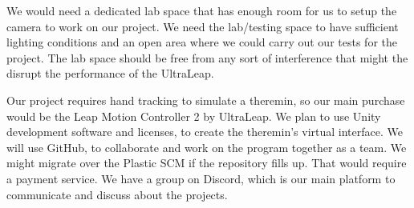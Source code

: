 We would need a dedicated lab space that has enough room for us to setup the camera to work on our project. We need the lab/testing space to have sufficient lighting conditions and an open area where we could carry out our tests for the project. The lab space should be free from any sort of interference that might the disrupt the performance of the UltraLeap. 

Our project requires hand tracking to simulate a theremin, so our main purchase would be the Leap Motion Controller 2 by UltraLeap. We plan to use Unity development software and licenses, to create the theremin's virtual interface. We will use GitHub, to collaborate and work on the program together as a team. We might migrate over the Plastic SCM if the repository fills up. That would require a payment service. We have a group on Discord, which is our main platform to communicate and discuss about the projects.

